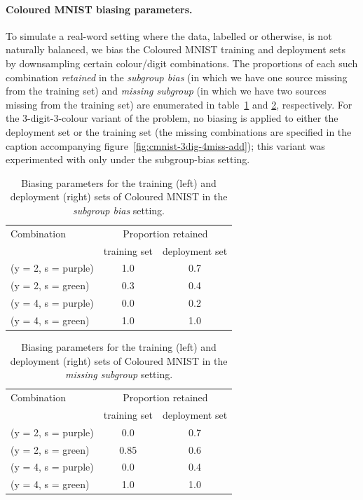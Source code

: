 \paragraph{Coloured MNIST biasing parameters.}
To simulate a real-word setting where the data, labelled or otherwise, is not naturally balanced, we bias the Coloured MNIST training and deployment sets by downsampling certain colour/digit combinations. The proportions of each such combination \emph{retained} in the \emph{subgroup bias} (in which we have one source missing from the training set) and \emph{missing subgroup} (in which we have two sources missing from the training set) are enumerated in table~\ref{color_mnist_biasing_po} and \ref{color_mnist_biasing_id}, respectively.
For the 3-digit-3-colour variant of the problem, no biasing is applied to either the deployment set or the training set (the missing combinations are specified in the caption accompanying figure~\ref{fig:cmnist-3dig-4miss-add}); this variant was experimented with only under the subgroup-bias setting.

\begin{table}[ht]
\caption{Biasing parameters for the training (left) and deployment (right) sets of Coloured MNIST in the \emph{subgroup bias} setting.}
\label{color_mnist_biasing_po}
\centering
\begin{tabular}{lcc}
\toprule
Combination   & \multicolumn{2}{c}{Proportion retained} \\ \cmidrule(lr){2-3}
  & training set & deployment set \\ \midrule
(y = 2, s = {\color{purple}purple}) & 1.0  & 0.7 \\
(y = 2, s = {\color{green}green})   & 0.3  & 0.4 \\
(y = 4, s = {\color{purple}purple}) & 0.0  & 0.2 \\
(y = 4, s = {\color{green}green})   & 1.0  & 1.0 \\
\bottomrule
\end{tabular}
\end{table}

\begin{table}[ht]
\caption{Biasing parameters for the training (left) and deployment (right) sets of Coloured MNIST in the \emph{missing subgroup} setting.}
\label{color_mnist_biasing_id}
\centering
\begin{tabular}{lcc}
\toprule
Combination   & \multicolumn{2}{c}{Proportion retained} \\ \cmidrule(lr){2-3}
  & training set & deployment set \\ \midrule
(y = 2, s = {\color{purple}purple}) & 0.0  & 0.7 \\
(y = 2, s = {\color{green}green})   & 0.85 & 0.6 \\
(y = 4, s = {\color{purple}purple}) & 0.0  & 0.4 \\
(y = 4, s = {\color{green}green})   & 1.0  & 1.0 \\
\bottomrule
\end{tabular}
\end{table}

